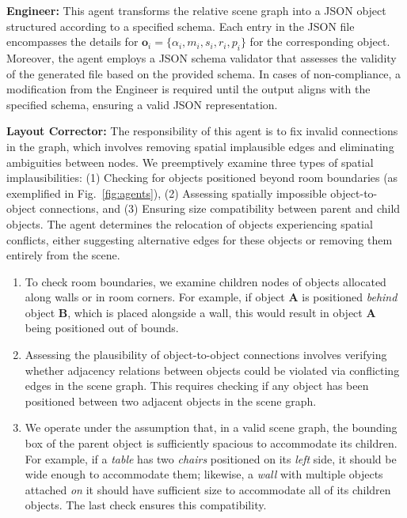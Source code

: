 \documentclass[runningheads]{llncs}
\begin{document}
\textbf{Engineer:}
This agent transforms the relative scene graph into a JSON object structured according to a specified schema. Each entry in the JSON file encompasses the details for $\mathbf{o}_i = \{\alpha_i, m_i, s_i, r_i, p_i\}$ for the corresponding object. Moreover, the agent employs a JSON schema validator that assesses the validity of the generated file based on the provided schema. In cases of non-compliance, a modification from the Engineer is required 
until the output aligns with the specified schema, ensuring a valid JSON representation.

\textbf{Layout Corrector:} 
The responsibility of this agent is to fix invalid connections in the graph, which involves removing spatial implausible edges and eliminating ambiguities between nodes. 
We preemptively examine three types of spatial implausibilities: (1) Checking for objects positioned beyond room boundaries (as exemplified in Fig.~\ref{fig:agents}), (2) Assessing spatially impossible object-to-object connections, and (3) Ensuring size compatibility between parent and child objects.
The agent determines the relocation of objects experiencing spatial conflicts, either suggesting alternative edges for these objects or removing them entirely from the scene.

\begin{enumerate}
\item To check room boundaries, we examine children nodes of objects allocated along walls or in room corners.
For example, if object \textbf{A} is positioned \textit{behind} object \textbf{B}, which is placed alongside a wall, this would result in object \textbf{A} being positioned out of bounds.
 \item Assessing the plausibility of object-to-object connections involves verifying whether adjacency relations between objects could be violated via conflicting edges in the scene graph. This requires checking if any object has been positioned between two adjacent objects in the scene graph.
\item We operate under the assumption that, in a valid scene graph, the bounding box of the parent object is sufficiently spacious to accommodate its children.
For example, if a \textit{table} has two \textit{chairs} positioned on its \textit{left} side, it should be wide enough to accommodate them; likewise, a \textit{wall} with multiple objects attached \textit{on} it should have sufficient size to accommodate all of its children objects. 
The last check ensures this compatibility. 
\end{enumerate}
\end{document}
